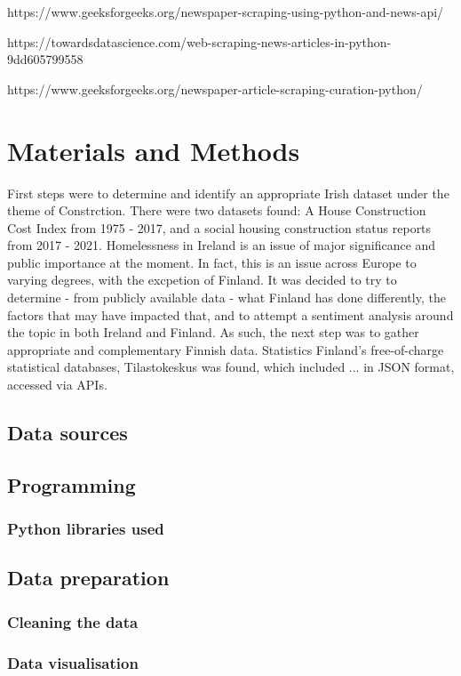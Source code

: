 \documentclass[hidelinks,12pt,oneside]{report} %
\begin{document}
https://www.geeksforgeeks.org/newspaper-scraping-using-python-and-news-api/

https://towardsdatascience.com/web-scraping-news-articles-in-python-9dd605799558

https://www.geeksforgeeks.org/newspaper-article-scraping-curation-python/
\chapter{Materials and Methods}

First steps were to determine and identify an appropriate Irish dataset under the theme of Constrction. There were two datasets found: A House Construction Cost Index from 1975 - 2017, and a social housing construction status reports from 2017 - 2021. Homelessness in Ireland is an issue of major significance and public importance at the moment. In fact, this is an issue across Europe to varying degrees, with the excpetion of Finland. It was decided to try to determine - from publicly available data - what Finland has done differently, the factors that may have impacted that, and to attempt a sentiment analysis around the topic in both Ireland and Finland. As such, the next step was to gather appropriate and complementary Finnish data. Statistics Finland’s free-of-charge statistical databases, Tilastokeskus was found, which included ... in JSON format, accessed via APIs.
 
\section{Data sources}

\section{Programming}


\subsection{Python libraries used}


\section{Data preparation}
\subsection{Cleaning the data}


\subsection{Data visualisation}
\end{document}
